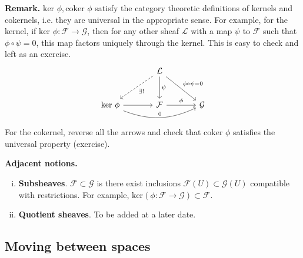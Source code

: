 \documentclass{article}
\theoremstyle{definition}
\begin{document}
\textbf{Remark.} $\text{ker }\phi, \text{coker }\phi$ satisfy the category theoretic definitions of kernels and cokernels, i.e. they are universal in the appropriate sense. For example, for the kernel, if $\text{ker }\phi : \mathcal{F} \to \mathcal{G}$, then for any other sheaf $\mathcal{L}$ with a map  $\psi $ to $\mathcal{F}$ such that $\phi \circ \psi = 0$, this map factors uniquely through the kernel. This is easy to check and left as an exercise.
\[\begin{tikzcd}[row sep=large,column sep=large]
    & \mathcal{L} & \\
    \text{ker }\phi & \mathcal{F} & \mathcal{G}
    \arrow["\psi", from=1-2, to=2-2]
    \arrow["\phi", from=2-2, to=2-3]
    \arrow["\phi \circ \psi = 0", from=1-2, to=2-3]
    \arrow[,from = 2-1, to = 2-2]
    \arrow["\exists !", from=1-2, to=2-1, dashed]
    \arrow["0", from = 2-1, to = 2-3, bend right = 23]
\end{tikzcd}\]
For the cokernel, reverse all the arrows and check that $\text{coker }\phi$ satisfies the universal property (exercise).

\textbf{Adjacent notions.}
\begin{enumerate}[(i)]
    \item \textbf{Subsheaves}. $\mathcal{F} \subset \mathcal{G}$ is there exist inclusions $\mathcal{F}(U) \subset \mathcal{G}(U)$ compatible with restrictions. For example, $\text{ker}(\phi : \mathcal{F} \to \mathcal{G}) \subset \mathcal{F}$.
    \item \textbf{Quotient sheaves}. To be added at a later date.
\end{enumerate} 

\subsection{Moving between spaces}

\end{document}
